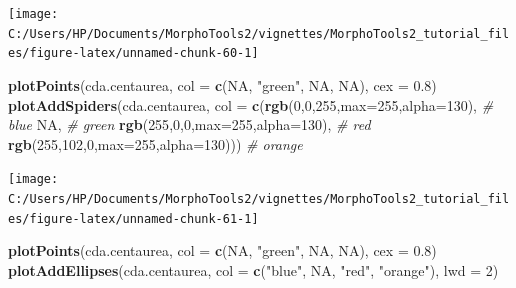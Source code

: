 \documentclass[
]{article}
\newenvironment{Shaded}{\begin{snugshade}}{\end{snugshade}}
\newcommand{\CommentTok}[1]{\textcolor[rgb]{0.56,0.35,0.01}{\textit{#1}}}
\newcommand{\DataTypeTok}[1]{\textcolor[rgb]{0.13,0.29,0.53}{#1}}
\newcommand{\DecValTok}[1]{\textcolor[rgb]{0.00,0.00,0.81}{#1}}
\newcommand{\FloatTok}[1]{\textcolor[rgb]{0.00,0.00,0.81}{#1}}
\newcommand{\KeywordTok}[1]{\textcolor[rgb]{0.13,0.29,0.53}{\textbf{#1}}}
\newcommand{\NormalTok}[1]{#1}
\newcommand{\OtherTok}[1]{\textcolor[rgb]{0.56,0.35,0.01}{#1}}
\newcommand{\StringTok}[1]{\textcolor[rgb]{0.31,0.60,0.02}{#1}}
\begin{document}
\begin{center}\texttt{[image: C:/Users/HP/Documents/MorphoTools2/vignettes/MorphoTools2\_tutorial\_files/figure-latex/unnamed-chunk-60-1]} \end{center}

\begin{Shaded}
\begin{Highlighting}[]
\KeywordTok{plotPoints}\NormalTok{(cda.centaurea, }\DataTypeTok{col =} \KeywordTok{c}\NormalTok{(}\OtherTok{NA}\NormalTok{, }\StringTok{"green"}\NormalTok{, }\OtherTok{NA}\NormalTok{, }\OtherTok{NA}\NormalTok{), }\DataTypeTok{cex =} \FloatTok{0.8}\NormalTok{)}
\KeywordTok{plotAddSpiders}\NormalTok{(cda.centaurea, }\DataTypeTok{col =} \KeywordTok{c}\NormalTok{(}\KeywordTok{rgb}\NormalTok{(}\DecValTok{0}\NormalTok{,}\DecValTok{0}\NormalTok{,}\DecValTok{255}\NormalTok{,}\DataTypeTok{max=}\DecValTok{255}\NormalTok{,}\DataTypeTok{alpha=}\DecValTok{130}\NormalTok{), }\CommentTok{# blue}
                                      \OtherTok{NA}\NormalTok{, }\CommentTok{# green}
                                      \KeywordTok{rgb}\NormalTok{(}\DecValTok{255}\NormalTok{,}\DecValTok{0}\NormalTok{,}\DecValTok{0}\NormalTok{,}\DataTypeTok{max=}\DecValTok{255}\NormalTok{,}\DataTypeTok{alpha=}\DecValTok{130}\NormalTok{), }\CommentTok{# red}
                                      \KeywordTok{rgb}\NormalTok{(}\DecValTok{255}\NormalTok{,}\DecValTok{102}\NormalTok{,}\DecValTok{0}\NormalTok{,}\DataTypeTok{max=}\DecValTok{255}\NormalTok{,}\DataTypeTok{alpha=}\DecValTok{130}\NormalTok{))) }\CommentTok{# orange}
\end{Highlighting}
\end{Shaded}

\begin{center}\texttt{[image: C:/Users/HP/Documents/MorphoTools2/vignettes/MorphoTools2\_tutorial\_files/figure-latex/unnamed-chunk-61-1]} \end{center}

\begin{Shaded}
\begin{Highlighting}[]
\KeywordTok{plotPoints}\NormalTok{(cda.centaurea, }\DataTypeTok{col =} \KeywordTok{c}\NormalTok{(}\OtherTok{NA}\NormalTok{, }\StringTok{"green"}\NormalTok{, }\OtherTok{NA}\NormalTok{, }\OtherTok{NA}\NormalTok{), }\DataTypeTok{cex =} \FloatTok{0.8}\NormalTok{)}
\KeywordTok{plotAddEllipses}\NormalTok{(cda.centaurea, }\DataTypeTok{col =} \KeywordTok{c}\NormalTok{(}\StringTok{"blue"}\NormalTok{, }\OtherTok{NA}\NormalTok{, }\StringTok{"red"}\NormalTok{, }\StringTok{"orange"}\NormalTok{), }\DataTypeTok{lwd =} \DecValTok{2}\NormalTok{)}
\end{Highlighting}
\end{Shaded}
\end{document}
